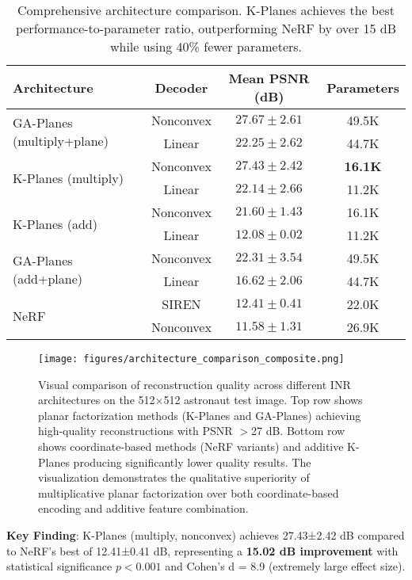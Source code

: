 \documentclass{article}
\begin{document}
\begin{table}[t]
\centering
\small
\begin{tabular}{@{}lccc@{}}
\toprule
\textbf{Architecture} & \textbf{Decoder} & \textbf{Mean PSNR (dB)} & \textbf{Parameters} \\
\midrule
\multirow{2}{*}{GA-Planes (multiply+plane)} & Nonconvex & $\mathbf{27.67 \pm 2.61}$ & 49.5K \\
 & Linear & $22.25 \pm 2.62$ & 44.7K \\
\midrule
\multirow{2}{*}{K-Planes (multiply)} & Nonconvex & $27.43 \pm 2.42$ & \textbf{16.1K} \\
 & Linear & $22.14 \pm 2.66$ & 11.2K \\
\midrule
\multirow{2}{*}{K-Planes (add)} & Nonconvex & $21.60 \pm 1.43$ & 16.1K \\
 & Linear & $12.08 \pm 0.02$ & 11.2K \\
\midrule
\multirow{2}{*}{GA-Planes (add+plane)} & Nonconvex & $22.31 \pm 3.54$ & 49.5K \\
 & Linear & $16.62 \pm 2.06$ & 44.7K \\
\midrule
\multirow{2}{*}{NeRF} & SIREN & $12.41 \pm 0.41$ & 22.0K \\
 & Nonconvex & $11.58 \pm 1.31$ & 26.9K \\
\bottomrule
\end{tabular}
\caption{Comprehensive architecture comparison. K-Planes achieves the best performance-to-parameter ratio, outperforming NeRF by over 15 dB while using 40\% fewer parameters.}
\label{tab:primary_results}
\end{table}

\begin{figure}[ht]
\centering
\texttt{[image: figures/architecture\_comparison\_composite.png]}
\caption{Visual comparison of reconstruction quality across different INR architectures on the 512×512 astronaut test image. Top row shows planar factorization methods (K-Planes and GA-Planes) achieving high-quality reconstructions with PSNR $>$27 dB. Bottom row shows coordinate-based methods (NeRF variants) and additive K-Planes producing significantly lower quality results. The visualization demonstrates the qualitative superiority of multiplicative planar factorization over both coordinate-based encoding and additive feature combination.}
\label{fig:architecture_comparison}
\end{figure}

\textbf{Key Finding}: K-Planes (multiply, nonconvex) achieves 27.43±2.42 dB compared to NeRF's best of 12.41±0.41 dB, representing a \textbf{15.02 dB improvement} with statistical significance $p < 0.001$ and Cohen's d = 8.9 (extremely large effect size).
\end{document}
